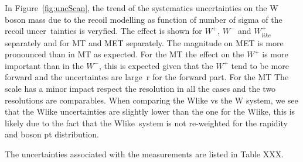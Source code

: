 In Figure~\ref{fig:uncScan}, the trend of the systematics uncertainties on the W boson mass due to the recoil modelling as function of number of sigma of the recoil uncer\
tainties is veryfied.
The effect is shown for $W^{+}$, $W^{-}$ and $W_{like}^{+}$ separately and for MT and MET separately.
The magnitude on MET is more pronounced than in MT as expected.
For the MT the effect on the $W^{+}$ is more important than in the $W^{-}$, this is expected given that the $W^{+}$ tend to be more forward and the uncertaintes are large\
r for the forward part.
For the MT The scale has a minor impact respect the resolution in all the cases and the two resolutions are comparables.
When comparing the Wlike vs the W system, we see that the Wlike uncertainties are slightly lower than the one for the Wlike, this is likely due to the fact that the Wlike\
 system is not re-weighted for the rapidity and boson pt distribution.

The uncertainties associated with the measurements are listed in Table XXX.
